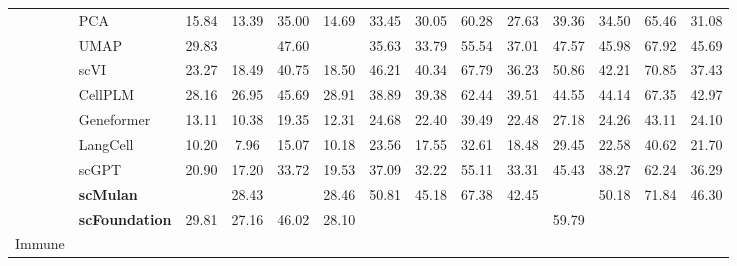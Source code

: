 \begin{table}[htbp]
\begin{tabular}{llcccccccccccc}
      & PCA      &   15.84 &   13.39 &   35.00 &   14.69 &   33.45 &   30.05 &   60.28 &   27.63 &   39.36 &   34.50 &   65.46 &   31.08  \\
      & UMAP      &   29.83 & \cellcolor{gray!25}{31.52} &   47.60 & \cellcolor{gray!25}{37.54} &   35.63 &   33.79 &   55.54 &   37.01 &   47.57 &   45.98 &   67.92 &   45.69  \\
      & scVI      &   23.27 &   18.49 &   40.75 &   18.50 &   46.21 &   40.34 &   67.79 &   36.23 &   50.86 &   42.21 &   70.85 &   37.43  \\
      & CellPLM      &   28.16 &   26.95 &   45.69 &   28.91 &   38.89 &   39.38 &   62.44 &   39.51 &   44.55 &   44.14 &   67.35 &   42.97  \\
      & Geneformer      &   13.11 &   10.38 &   19.35 &   12.31 &   24.68 &   22.40 &   39.49 &   22.48 &   27.18 &   24.26 &   43.11 &   24.10  \\
      & LangCell      &   10.20 &   7.96 &   15.07 &   10.18 &   23.56 &   17.55 &   32.61 &   18.48 &   29.45 &   22.58 &   40.62 &   21.70  \\
      & scGPT      &   20.90 &   17.20 &   33.72 &   19.53 &   37.09 &   32.22 &   55.11 &   33.31 &   45.43 &   38.27 &   62.24 &   36.29  \\
      & \cellcolor{gray!25}\textbf{scMulan}      & \cellcolor{gray!25}{33.36} &   28.43 & \cellcolor{gray!25}{48.73} &   28.46 &   50.81 &   45.18 &   67.38 &   42.45 & \cellcolor{gray!25}{60.71} &   50.18 &   71.84 &   46.30  \\
      & \cellcolor{gray!25}\textbf{scFoundation}      &   29.81 &   27.16 &   46.02 &   28.10 & \cellcolor{gray!25}{51.62} & \cellcolor{gray!25}{47.90} & \cellcolor{gray!25}{69.23} & \cellcolor{gray!25}{45.89} &   59.79 & \cellcolor{gray!25}{52.19} & \cellcolor{gray!25}{73.93} & \cellcolor{gray!25}{48.63}  \\
    \midrule

    \multirow{9}{*}{Immune}


\end{tabular}
\end{table}
